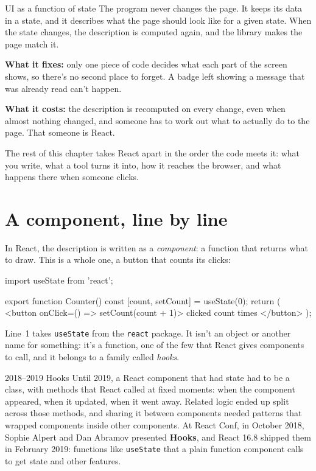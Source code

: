 \begin{concept}{UI as a function of state}
The program never changes the page. It keeps its data in a state, and it
describes what the page should look like for a given state. When the state
changes, the description is computed again, and the library makes the page
match it.

\textbf{What it fixes:} only one piece of code decides what each part of the
screen shows, so there's no second place to forget. A badge left showing a
message that was already read can't happen.

\textbf{What it costs:} the description is recomputed on every change, even
when almost nothing changed, and someone has to work out what to actually do to
the page. That someone is React.
\end{concept}

The rest of this chapter takes React apart in the order the code meets it: what
you write, what a tool turns it into, how it reaches the browser, and what
happens there when someone clicks.

\section{A component, line by line}

In React, the description is written as a \emph{component}: a function that
returns what to draw. This is a whole one, a button that counts its clicks:

\begin{code}
import { useState } from 'react';

export function Counter() {
  const [count, setCount] = useState(0);
  return (
    <button onClick={() => setCount(count + 1)}>
      clicked {count} times
    </button>
  );
}
\end{code}

Line~1 takes \texttt{useState} from the \texttt{react} package. It isn't an
object or another name for something: it's a function, one of the few that
React gives components to call, and it belongs to a family called
\emph{hooks}.

\begin{history}{2018--2019 \textperiodcentered{} Hooks}
Until 2019, a React component that had state had to be a class, with methods
that React called at fixed moments: when the component appeared, when it
updated, when it went away. Related logic ended up split across those methods,
and sharing it between components needed patterns that wrapped components
inside other components. At React Conf, in October 2018, Sophie Alpert and Dan
Abramov presented \textbf{Hooks}, and React 16.8 shipped them in February 2019:
functions like \texttt{useState} that a plain function component calls to get
state and other features.
\end{history}

